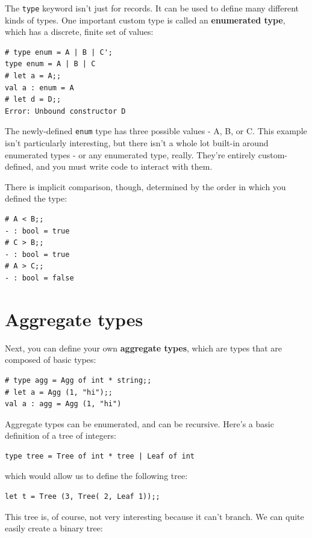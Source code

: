 \documentclass[10pt]{book}
\begin{document}
The {\tt type} keyword isn't just for records. It can be used to define many different kinds of types. One important custom type is called an {\bf enumerated type}, which has a discrete, finite set of values:

\beforeverb
\begin{verbatim}
# type enum = A | B | C';
type enum = A | B | C
# let a = A;;
val a : enum = A
# let d = D;;
Error: Unbound constructor D
\end{verbatim}
\afterverb

The newly-defined {\tt enum} type has three possible values - A, B, or C. This example isn't particularly interesting, but there isn't a whole lot built-in around enumerated types - or any enumerated type, really. They're entirely custom-defined, and you must write code to interact with them.

There is implicit comparison, though, determined by the order in which you defined the type:

\beforeverb
\begin{verbatim}
# A < B;;
- : bool = true
# C > B;;
- : bool = true
# A > C;;
- : bool = false
\end{verbatim}
\afterverb

\section{Aggregate types}

Next, you can define your own {\bf aggregate types}, which are types that are composed of basic types:

\beforeverb
\begin{verbatim}
# type agg = Agg of int * string;;
# let a = Agg (1, "hi");;
val a : agg = Agg (1, "hi")
\end{verbatim}
\afterverb

Aggregate types can be enumerated, and can be recursive. Here's a basic definition of a tree of integers:

\beforeverb
\begin{verbatim}
type tree = Tree of int * tree | Leaf of int
\end{verbatim}
\afterverb

which would allow us to define the following tree:

\beforeverb
\begin{verbatim}
let t = Tree (3, Tree( 2, Leaf 1));;
\end{verbatim}
\afterverb

This tree is, of course, not very interesting because it can't branch. We can quite easily create a binary tree:
\end{document}
